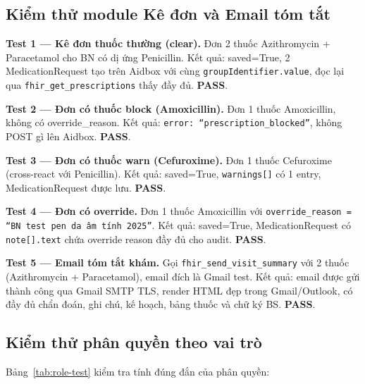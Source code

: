 \documentclass[a4paper,13pt,3p,oneside]{report}
\theoremstyle{definition}
\theoremstyle{remark}
\theoremstyle{definition}
\begin{document}
\subsection{Kiểm thử module Kê đơn và Email tóm tắt}

\textbf{Test 1 --- Kê đơn thuốc thường (clear).} Đơn 2 thuốc Azithromycin + Paracetamol cho BN có dị ứng Penicillin. Kết quả: saved=True, 2 MedicationRequest tạo trên Aidbox với cùng \texttt{groupIdentifier.value}, đọc lại qua \texttt{fhir\_get\_prescriptions} thấy đầy đủ. \textbf{PASS}.

\textbf{Test 2 --- Đơn có thuốc block (Amoxicillin).} Đơn 1 thuốc Amoxicillin, không có override\_reason. Kết quả: \texttt{error: ``prescription\_blocked''}, không POST gì lên Aidbox. \textbf{PASS}.

\textbf{Test 3 --- Đơn có thuốc warn (Cefuroxime).} Đơn 1 thuốc Cefuroxime (cross-react với Penicillin). Kết quả: saved=True, \texttt{warnings[]} có 1 entry, MedicationRequest được lưu. \textbf{PASS}.

\textbf{Test 4 --- Đơn có override.} Đơn 1 thuốc Amoxicillin với \texttt{override\_reason = ``BN test pen da âm tính 2025''}. Kết quả: saved=True, MedicationRequest có \texttt{note[].text} chứa override reason đầy đủ cho audit. \textbf{PASS}.

\textbf{Test 5 --- Email tóm tắt khám.} Gọi \texttt{fhir\_send\_visit\_summary} với 2 thuốc (Azithromycin + Paracetamol), email đích là Gmail test. Kết quả: email được gửi thành công qua Gmail SMTP TLS, render HTML đẹp trong Gmail/Outlook, có đầy đủ chẩn đoán, ghi chú, kế hoạch, bảng thuốc và chữ ký BS. \textbf{PASS}.

\subsection{Kiểm thử phân quyền theo vai trò}

Bảng~\ref{tab:role-test} kiểm tra tính đúng đắn của phân quyền:
\end{document}
